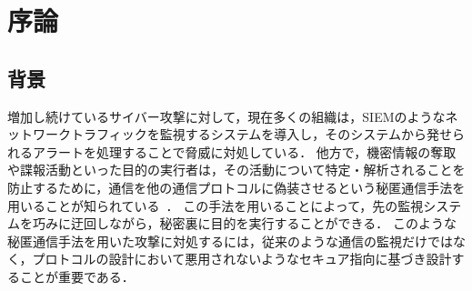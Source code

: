\section{序論}
\subsection{背景}
増加し続けているサイバー攻撃に対して，現在多くの組織は，SIEMのようなネットワークトラフィックを監視するシステムを導入し，そのシステムから発せられるアラートを処理することで脅威に対処している．
他方で，機密情報の奪取や諜報活動といった目的の実行者は，その活動について特定・解析されることを防止するために，通信を他の通信プロトコルに偽装させるという秘匿通信手法を用いることが知られている~\cite{mitre-custom-c2}．
この手法を用いることによって，先の監視システムを巧みに迂回しながら，秘密裏に目的を実行することができる．
このような秘匿通信手法を用いた攻撃に対処するには，従来のような通信の監視だけではなく，プロトコルの設計において悪用されないようなセキュア指向に基づき設計することが重要である．

